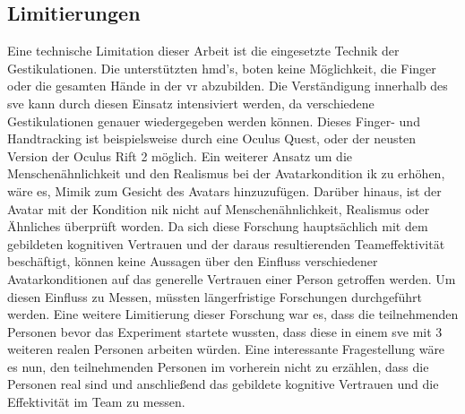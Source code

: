 \documentclass[a4paper,11pt]{article}%
\renewcommand{\\}{\vspace*{0.5\baselineskip} \newline}
\begin{document}
%
%
%
%
%
%

\subsection{Limitierungen}
Eine technische Limitation dieser Arbeit ist die eingesetzte Technik der Gestikulationen. Die unterstützten \ac{hmd}'s, boten keine Möglichkeit, die Finger oder die gesamten Hände in der \ac{vr} abzubilden. Die Verständigung innerhalb des \ac{sve} kann durch diesen Einsatz intensiviert werden, da verschiedene Gestikulationen genauer wiedergegeben werden können. Dieses Finger- und Handtracking ist beispielsweise durch eine Oculus Quest, oder der neusten Version der Oculus Rift 2 möglich.
Ein weiterer Ansatz um die Menschenähnlichkeit und den Realismus bei der Avatarkondition \ac{ik} zu erhöhen, wäre es, Mimik zum Gesicht des Avatars hinzuzufügen.
Darüber hinaus, ist der Avatar mit der Kondition \ac{nik} nicht auf Menschenähnlichkeit, Realismus oder Ähnliches überprüft worden.
Da sich diese Forschung hauptsächlich mit dem gebildeten kognitiven Vertrauen und der daraus resultierenden Teameffektivität beschäftigt, können keine Aussagen über den Einfluss verschiedener Avatarkonditionen auf das generelle Vertrauen einer Person getroffen werden. Um diesen Einfluss zu Messen, müssten längerfristige Forschungen durchgeführt werden. 
Eine weitere Limitierung dieser Forschung war es, dass die teilnehmenden Personen bevor das Experiment startete wussten, dass diese in einem \ac{sve} mit 3 weiteren realen Personen arbeiten würden. Eine interessante Fragestellung wäre es nun, den teilnehmenden Personen im vorherein nicht zu erzählen, dass die Personen real sind und anschließend das gebildete kognitive Vertrauen und die Effektivität im Team zu messen.
\end{document}
